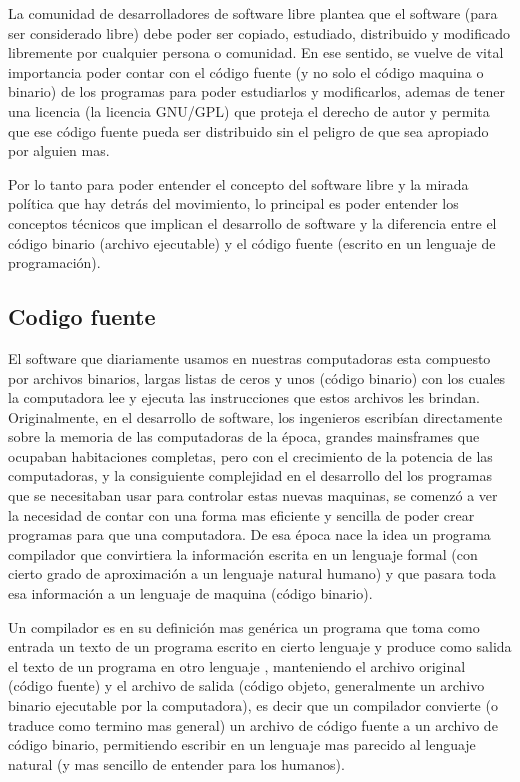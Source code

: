 La comunidad de desarrolladores de software libre plantea que el software (para ser considerado libre) debe poder ser copiado, estudiado, distribuido y modificado libremente por cualquier persona o comunidad. En ese sentido, se vuelve de vital importancia poder contar con el código fuente (y no solo el código maquina o binario) de los programas para poder estudiarlos y modificarlos, ademas de tener una licencia (la licencia GNU/GPL) que proteja el derecho de autor y permita que ese código fuente pueda ser distribuido sin el peligro de que sea apropiado por alguien mas.

Por lo tanto para poder entender el concepto del software libre y la mirada política que hay detrás del movimiento, lo principal es poder entender los conceptos técnicos que implican el desarrollo de software y la diferencia entre el código binario (archivo ejecutable)  y el código fuente (escrito en un lenguaje de programación).

\subsection{Codigo fuente}

El software que diariamente usamos en nuestras computadoras esta compuesto por archivos  binarios, largas listas de ceros y unos (código binario) con los cuales la computadora lee y ejecuta las instrucciones que estos archivos les brindan. Originalmente, en el desarrollo de software, los ingenieros escribían directamente sobre la memoria de las computadoras de la época, grandes mainsframes que ocupaban habitaciones completas, pero con el crecimiento de la potencia de las computadoras, y la consiguiente complejidad en el desarrollo del  los programas que se necesitaban usar para controlar estas nuevas maquinas, se comenzó a ver la necesidad de contar con una forma mas eficiente y sencilla de poder crear programas para que una computadora. De esa época nace la idea un programa compilador que convirtiera la información escrita en un lenguaje formal (con cierto grado de aproximación a un lenguaje natural humano) y que pasara toda esa información a un lenguaje de maquina (código binario).

Un compilador es en su definición mas genérica un programa que toma como entrada un texto de un programa escrito en cierto lenguaje y produce como salida el texto de un programa en otro lenguaje \citep{grune_diseno_2007}, manteniendo el archivo original (código fuente) y el archivo de salida (código objeto, generalmente un archivo binario ejecutable por la computadora),  es decir que un compilador convierte  (o traduce como termino mas general) un archivo de código fuente a un archivo de código binario, permitiendo escribir en un lenguaje mas parecido al lenguaje natural (y mas sencillo de entender para los humanos).

